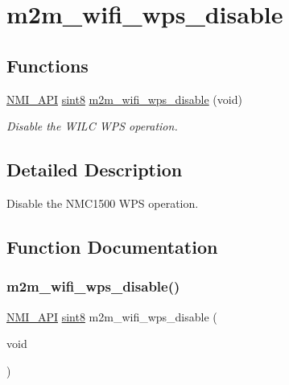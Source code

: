 \hypertarget{group__WifiWpsDisableFn}{}\section{m2m\+\_\+wifi\+\_\+wps\+\_\+disable}
\label{group__WifiWpsDisableFn}
\subsection*{Functions}
\begin{DoxyCompactItemize}
\item 
\hyperlink{group__BSPDefine_gaecc0323d771e41ef81a76b5f12783e22}{N\+M\+I\+\_\+\+A\+PI} \hyperlink{group__DataT_gae35f10ffd0ac8dd2bc3e794da9bdfbc7}{sint8} \hyperlink{group__WifiWpsDisableFn_gaeaf588c8639ed58897b765cc4b77f5b6}{m2m\+\_\+wifi\+\_\+wps\+\_\+disable} (void)
\begin{DoxyCompactList}\small\item\em Disable the W\+I\+LC W\+PS operation. \end{DoxyCompactList}\end{DoxyCompactItemize}


\subsection{Detailed Description}
Disable the N\+M\+C1500 W\+PS operation. 

\subsection{Function Documentation}
\mbox{\label{group__WifiWpsDisableFn_gaeaf588c8639ed58897b765cc4b77f5b6}} 
\subsubsection{\texorpdfstring{m2m\+\_\+wifi\+\_\+wps\+\_\+disable()}{m2m\_wifi\_wps\_disable()}}
{\footnotesize\ttfamily \hyperlink{group__BSPDefine_gaecc0323d771e41ef81a76b5f12783e22}{N\+M\+I\+\_\+\+A\+PI} \hyperlink{group__DataT_gae35f10ffd0ac8dd2bc3e794da9bdfbc7}{sint8} m2m\+\_\+wifi\+\_\+wps\+\_\+disable (\begin{DoxyParamCaption}\item[{void}]{ }\end{DoxyParamCaption})}



